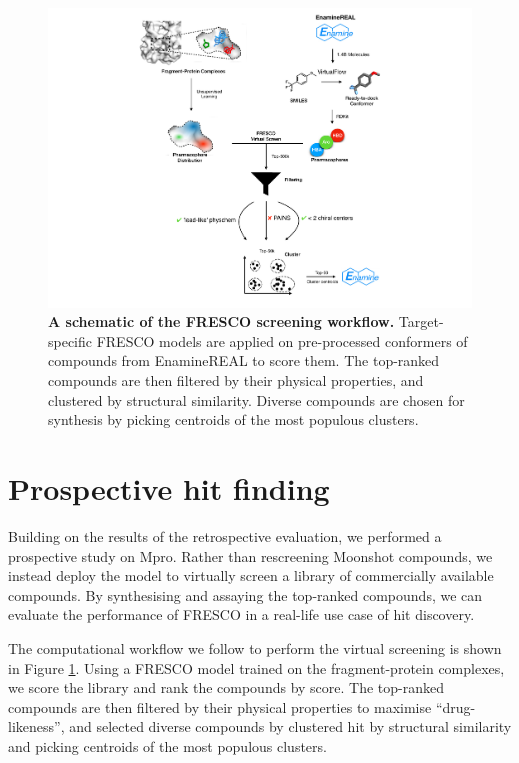 \begin{figure}[!h]
 \centering
 \includegraphics[width=0.8\linewidth]{Chapters/Fresco/Figs/flowchart_details.pdf}
 \caption{\textbf{A schematic of the FRESCO screening workflow.} Target-specific FRESCO models are applied on pre-processed conformers of compounds from EnamineREAL to score them. The top-ranked compounds are then filtered by their physical properties, and clustered by structural similarity. Diverse compounds are chosen for synthesis by picking centroids of the most populous clusters.}
 \label{fig:screening_workflow}
\end{figure}

\section{Prospective hit finding} \label{sec:prospective}

Building on the results of the retrospective evaluation, we performed a prospective study on Mpro. Rather than rescreening Moonshot compounds, we instead deploy the model to virtually screen a library of commercially available compounds. By synthesising and assaying the top-ranked compounds, we can evaluate the performance of FRESCO in a real-life use case of hit discovery.

The computational workflow we follow to perform the virtual screening is shown in Figure \ref{fig:screening_workflow}. Using a FRESCO model trained on the fragment-protein complexes, we score the library and rank the compounds by score. The top-ranked compounds are then filtered by their physical properties to maximise ``drug-likeness'', and selected diverse compounds by clustered hit by structural similarity and picking centroids of the most populous clusters.

